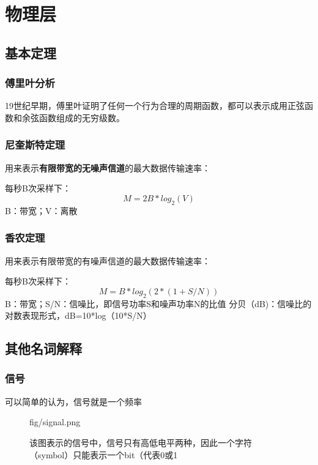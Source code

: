 \section{物理层}
\subsection{基本定理}
\subsubsection{傅里叶分析}
19世纪早期，傅里叶证明了任何一个行为合理的周期函数，都可以表示成用正弦函数和余弦函数组成的无穷级数。

\subsubsection{尼奎斯特定理}
用来表示\textbf{有限带宽的无噪声信道}的最大数据传输速率：

\begin{eqbox}
    每秒B次采样下：
    \begin{equation}
        M=2B*log_2(V)  
    \end{equation}
    \tcblower
    B：带宽；V：离散
\end{eqbox}
\subsubsection{香农定理}
用来表示有限带宽的有噪声信道的最大数据传输速率：
\begin{eqbox}
    每秒B次采样下：
    \begin{equation}
        M=B*log_2(2*(1+S/N))  
    \end{equation}
    \tcblower
    B：带宽；S/N：信噪比，即信号功率S和噪声功率N的比值
    \tcblower
    分贝（dB)：信噪比的对数表现形式，dB=10*log（10*S/N）
\end{eqbox}

\subsection{其他名词解释}
\subsubsection{信号}
可以简单的认为，信号就是一个频率
\begin{figure}[H]
    \centering
    
    \caption[width=0.8\textwidth]{fig/signal.png}
    \caption{该图表示的信号中，信号只有高低电平两种，因此一个字符（symbol）只能表示一个bit（代表0或1}
    \label{fig:信号}
\end{figure}

